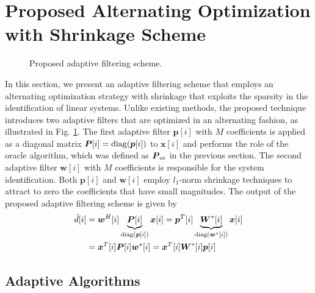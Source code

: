 \documentclass[10pt,onecolumn]{IEEEtran}
\begin{document}
\section{Proposed Alternating Optimization with Shrinkage Scheme}


\begin{figure}[!htb]
\begin{center}
\def\epsfsize#1#2{0.7\columnwidth}
 \vspace{-0.5em}\caption{ Proposed adaptive
filtering scheme.}\label{fig:alt}
\end{center}
\end{figure}

In this section, we present an adaptive filtering scheme that
employs an alternating optimization strategy with shrinkage that
exploits the sparsity in the identification of linear systems.
Unlike existing methods, the proposed technique introduces two
adaptive filters that are optimized in an alternating fashion, as
illustrated in Fig. \ref{fig:alt}. The first adaptive filter
${\boldsymbol p}[i]$ with $M$ coefficients is applied as a diagonal
matrix ${\boldsymbol P}[i] = {\rm diag}({\boldsymbol p}[i])$ to
${\boldsymbol x}[i]$ and performs the role of the oracle algorithm,
which was defined as ${\boldsymbol P}_{\rm or}$ in the previous
section. The second adaptive filter ${\boldsymbol w}[i]$ with $M$
coefficients is responsible for the system identification. Both
${\boldsymbol p}[i]$ and ${\boldsymbol w}[i]$ employ $l_1$-norm
shrinkage techniques to attract to zero the coefficients that have
small magnitudes.  The output of the proposed adaptive filtering
scheme is given by
\begin{equation}
\begin{split}
\hat{d}[i] & = {\boldsymbol w}^H[i] \underbrace{{\boldsymbol P}[i]}_{{\rm diag}({\boldsymbol p}[i])}
{\boldsymbol x}[i] = {\boldsymbol p}^T[i] \underbrace{{\boldsymbol W}^*[i]}_{{\rm diag}({\boldsymbol w}^*[i])}
{\boldsymbol x}[i] \\
& = {\boldsymbol x}^T[i] {\boldsymbol P}[i] {\boldsymbol w}^*[i] = {\boldsymbol x}^T[i] {\boldsymbol W}^*[i]{\boldsymbol p}[i]
\end{split}
\end{equation}

\subsection{Adaptive Algorithms}
\end{document}
